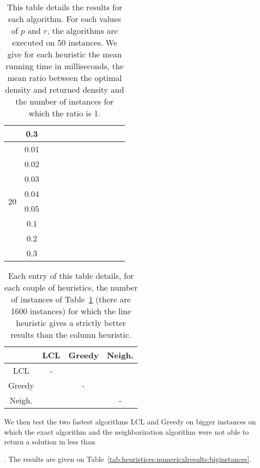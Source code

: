 \begin{table}[ht!]
\begin{tabular}{| c | c | c | c | c | c | c | c | c |  c | c | c | }
		\cline{2-12}
		& 0.3 & & & & & & & & & & \\
		\hline
		\multirow{8}{*}{20} & 0.01 & & & & & & & & & & \\
		\cline{2-12}
		& 0.02 & & & & & & & & & & \\
		\cline{2-12}
		& 0.03 & & & & & & & & & & \\
		\cline{2-12}
		& 0.04 & & & & & & & & & & \\
		\cline{2-12}
		& 0.05 & & & & & & & & & & \\
		\cline{2-12}
		& 0.1 & & & & & & & & & & \\
		\cline{2-12}
		& 0.2 & & & & & & & & & & \\
		\cline{2-12}
		& 0.3 & & & & & & & & & & \\
		\hline
	\end{tabular}
	\caption{This table details the results for each algorithm. For each values of $p$ and $r$, the algorithms are executed on 50 instances. We give for each heuristic the mean running time in milliseconds, the mean ratio between the optimal density and returned density and the number of instances for which the ratio is 1.}
	\label{tab:heuristices:numericalresults:smallinstances:compareToExact}
\end{table}
	
	\begin{table}[ht!]
		\centering
		\def\arraystretch{1.2}
		\setlength\tabcolsep{0.075cm}
	\begin{tabular}{| c | c | c | c | }
	\hline
	& LCL & Greedy & Neigh. \\
	\hline
	LCL & - & & \\
	\hline
	Greedy & & - & \\
	\hline
	Neigh. & & & - \\
	\hline
\end{tabular}
	\caption{Each entry of this table details, for each couple of heuristics, the number of instances of Table~\ref{tab:heuristices:numericalresults:smallinstances:compareToExact} (there are 1600 instances) for which the line heuristic gives a strictly better results than the column heuristic. }
	\label{tab:heuristices:numericalresults:smallinstances:compareToEachOther}
\end{table}


We then test the two fastest algorithms LCL and Greedy on bigger instances on which the exact algorithm and the neighborization algorithm were not able to return a solution in less than \begin{comment}1 minute\end{comment}. The results are given on Table~\ref{tab:heuristices:numericalresults:biginstances}.

